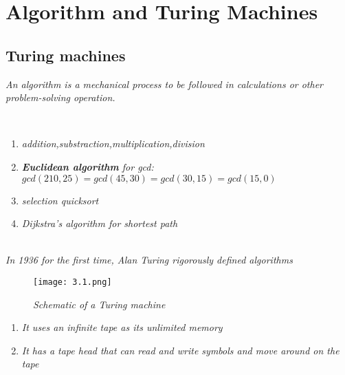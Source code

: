 \documentclass{article}
\begin{document}
\setcounter{section}{2}
\else
\fi
\section{Algorithm and Turing Machines}

\subsection{Turing machines}

\textit{An algorithm is a mechanical process to be followed in calculations or other problem-solving operation.}

\begin{example}
    \

    \begin{enumerate}
        \item \textit{addition,substraction,multiplication,division}
        \item \textit{\textbf{Euclidean algorithm} for gcd:}
        $gcd(210,25)=gcd(45,30)=gcd(30,15)=gcd(15,0)$
        \item \textit{selection quicksort}
        \item \textit{Dijkstra's algorithm for shortest path}
    \end{enumerate}
\end{example}

\textit{\\In 1936 for the first time, Alan Turing rigorously defined algorithms}

\begin{figure}[H]
    \begin{center}
        \texttt{[image: 3.1.png]}
    \end{center}
    \caption{\textit{Schematic of a Turing machine}}
\end{figure}

\begin{enumerate}
    \item \textit{It uses an infinite tape as its unlimited memory}
    \item \textit{It has a tape head that can read and write symbols and move around on the tape}  
\end{enumerate}
\end{document}
